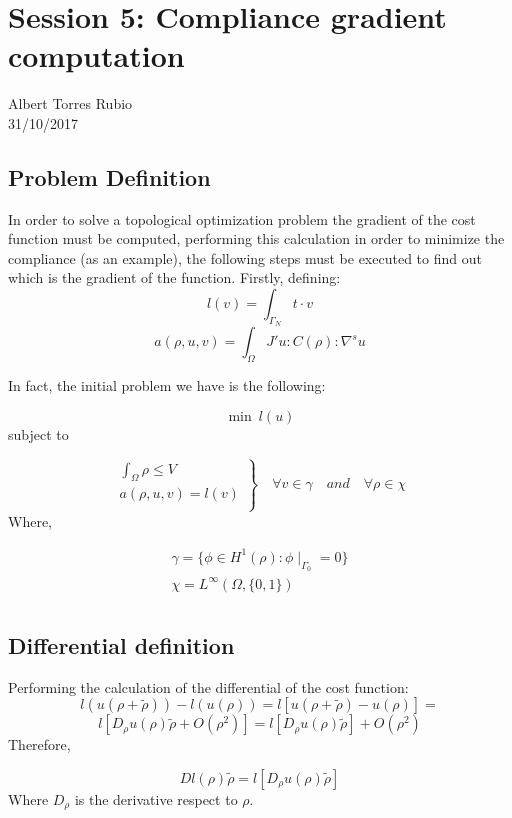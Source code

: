 

\section{Session 5: Compliance gradient computation}
\begin{center}
Albert Torres Rubio \\
31/10/2017
\end{center}

\subsection{Problem Definition}
In order to solve a topological optimization problem the gradient of the cost function must be computed, performing this calculation in order to minimize the compliance (as an example), the following steps must be executed to find out which is the gradient of the function.
Firstly, defining:
$$ l(v) = \int_{\Gamma_N} t \cdot v $$
$$ a(\rho, u, v)= \int_\Omega J' u : C(\rho) : \nabla^s u $$

In fact, the initial problem we have is the following:

$$ \min \: l(u) $$
subject to

$$ \left.
\begin{array}{c}
\int_\Omega \rho \leq V \\
a(\rho, u, v)= l(v)  \\
\end{array} \right\}     \quad \forall  v \in \gamma \quad and \quad \forall \rho \in \chi$$
Where,

$$ \begin{array}{c}
\gamma = \{ \phi \in H^{1} (\rho) : \phi \mid_{\Gamma_{0} }  = 0 \} \\
\chi = L^{\infty
} (\Omega, \{0,1\})  \\
\end{array}$$

\subsection{Differential definition}
Performing the calculation of the differential of the cost function:
$$l(u(\rho + \tilde{\rho}))-l(u(\rho))=l[u(\rho + \tilde{\rho})-u(\rho)]=$$
$$l[D_\rho u(\rho)\tilde{\rho} + O(\rho^2)]= l[D_\rho u(\rho) \tilde{\rho}]+O(\rho^2)$$
Therefore,

\begin{equation} \label{E:D}
Dl(\rho)\tilde{\rho} =  l[D_\rho u(\rho) \tilde{\rho}]
\end{equation}
Where $D_\rho$ is the derivative respect to $\rho$.

